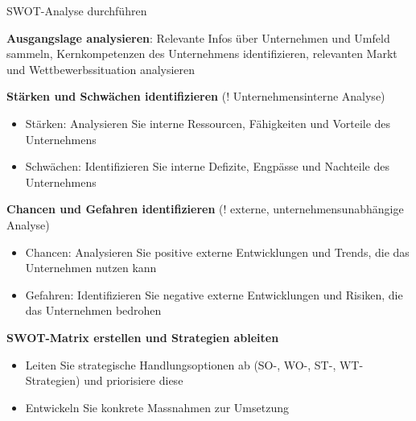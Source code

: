 \begin{KR}{SWOT-Analyse durchführen}

\textbf{Ausgangslage analysieren}: 
Relevante Infos über Unternehmen und Umfeld sammeln, Kernkompetenzen des Unternehmens identifizieren, relevanten Markt und Wettbewerbssituation analysieren

\textbf{Stärken und Schwächen identifizieren} (! Unternehmensinterne Analyse)
\begin{itemize}
    \item Stärken: Analysieren Sie interne Ressourcen, Fähigkeiten und Vorteile des Unternehmens
    \item Schwächen: Identifizieren Sie interne Defizite, Engpässe und Nachteile des Unternehmens
\end{itemize}

\textbf{Chancen und Gefahren identifizieren} (! externe, unternehmensunabhängige Analyse)
\begin{itemize}
    \item Chancen: Analysieren Sie positive externe Entwicklungen und Trends, die das Unternehmen nutzen kann
    \item Gefahren: Identifizieren Sie negative externe Entwicklungen und Risiken, die das Unternehmen bedrohen
\end{itemize}

\textbf{SWOT-Matrix erstellen und Strategien ableiten}
\begin{itemize}
    \item Leiten Sie strategische Handlungsoptionen ab (SO-, WO-, ST-, WT-Strategien) und priorisiere diese
    \item Entwickeln Sie konkrete Massnahmen zur Umsetzung
\end{itemize}
\end{KR} 

